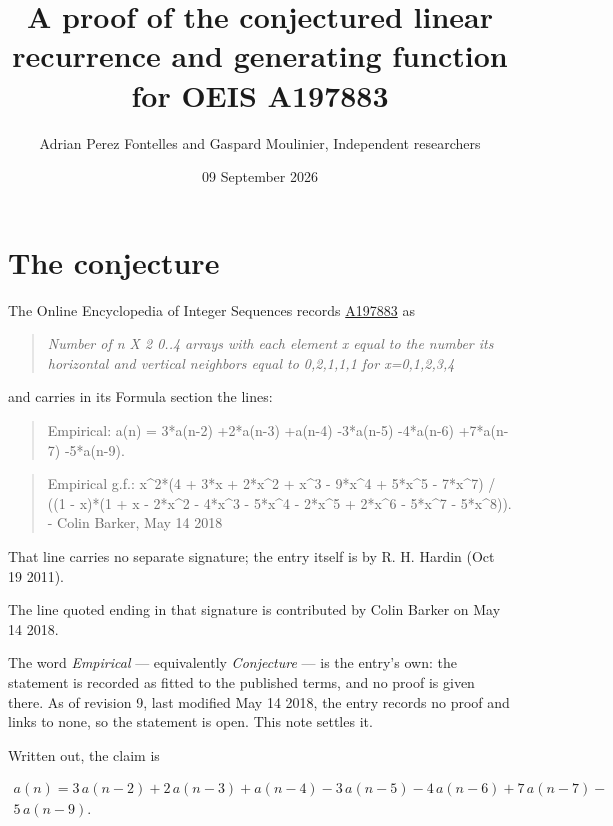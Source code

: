 \documentclass[11pt]{article}
\title{A proof of the conjectured linear recurrence and generating function for OEIS A197883}
\author{Adrian Perez Fontelles and Gaspard Moulinier, Independent researchers}
\date{09 September 2026}
\theoremstyle{definition}
\begin{document}
\maketitle
\section{The conjecture}

The Online Encyclopedia of Integer Sequences records \href{https://oeis.org/A197883}{A197883} as

\begin{quote}\itshape Number of n X 2 0..4 arrays with each element x equal to the number its horizontal and vertical neighbors equal to 0,2,1,1,1 for x=0,1,2,3,4\end{quote}

and carries in its Formula section the lines:

\begin{quote}\ttfamily Empirical: a(n) = 3*a(n-2) +2*a(n-3) +a(n-4) -3*a(n-5) -4*a(n-6) +7*a(n-7) -5*a(n-9).\end{quote}

\begin{quote}\ttfamily Empirical g.f.: x\textasciicircum{}2*(4 + 3*x + 2*x\textasciicircum{}2 + x\textasciicircum{}3 - 9*x\textasciicircum{}4 + 5*x\textasciicircum{}5 - 7*x\textasciicircum{}7) / ((1 - x)*(1 + x - 2*x\textasciicircum{}2 - 4*x\textasciicircum{}3 - 5*x\textasciicircum{}4 - 2*x\textasciicircum{}5 + 2*x\textasciicircum{}6 - 5*x\textasciicircum{}7 - 5*x\textasciicircum{}8)). - Colin Barker, May 14 2018\end{quote}

That line carries no separate signature; the entry itself is by R. H. Hardin (Oct 19 2011).

The line quoted ending in that signature is contributed by Colin Barker on May 14 2018.

The word {\itshape Empirical} --- equivalently {\itshape Conjecture} --- is the entry's own: the statement is recorded as fitted to the published terms, and no proof is given there. As of revision 9, last modified May 14 2018, the entry records no proof and links to none, so the statement is open. This note settles it.

Written out, the claim is

\begin{multline*} a(n) = 3\,a(n-2) + 2\,a(n-3) + a(n-4) - 3\,a(n-5) - 4\,a(n-6) + 7\,a(n-7) - \\ 5\,a(n-9). \end{multline*}
\end{document}
